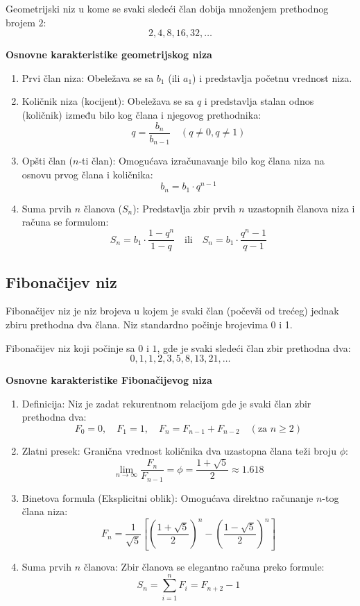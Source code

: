 \documentclass[12pt,a4paper]{report}
\begin{document}
Geometrijski niz u kome se svaki sledeći član dobija množenjem prethodnog brojem $2$:
\[2, 4, 8, 16, 32, \dots\]

\textbf{Osnovne karakteristike geometrijskog niza} 

\begin{enumerate}
	\item Prvi član niza: Obeležava se sa $b_1$ (ili $a_1$) i predstavlja početnu vrednost niza.
	\item Količnik niza (kocijent): Obeležava se sa $q$ i predstavlja stalan odnos (količnik) između bilo kog člana i njegovog prethodnika:
	\[q = \frac{b_n}{b_{n-1}} \quad (q \neq 0, q \neq 1)\]
	\item Opšti član ($n$-ti član): Omogućava izračunavanje bilo kog člana niza na osnovu prvog člana i količnika:
	\[b_n = b_1 \cdot q^{n-1}\]
	\item Suma prvih $n$ članova ($S_n$): Predstavlja zbir prvih $n$ uzastopnih članova niza i računa se formulom:
	\[S_n = b_1 \cdot \frac{1 - q^n}{1 - q} \quad \text{ili} \quad S_n = b_1 \cdot \frac{q^n - 1}{q - 1}\]
\end{enumerate}

\subsection{Fibonačijev niz}

Fibonačijev niz je niz brojeva u kojem je svaki član (počevši od trećeg) jednak zbiru prethodna dva člana. Niz standardno počinje brojevima 0 i 1.

Fibonačijev niz koji počinje sa $0$ i $1$, gde je svaki sledeći član zbir prethodna dva:
\[0, 1, 1, 2, 3, 5, 8, 13, 21, \dots\]

\textbf{Osnovne karakteristike Fibonačijevog niza}

\begin{enumerate}
	\item Definicija: Niz je zadat rekurentnom relacijom gde je svaki član zbir prethodna dva:
	\[F_0 = 0, \quad F_1 = 1, \quad F_n = F_{n-1} + F_{n-2} \quad (\text{za } n \ge 2)\]
	\item Zlatni presek: Granična vrednost količnika dva uzastopna člana teži broju $\phi$:
	\[\lim_{n \to \infty} \frac{F_n}{F_{n-1}} = \phi = \frac{1+\sqrt{5}}{2} \approx 1.618\]
	\item Binetova formula (Eksplicitni oblik): Omogućava direktno računanje $n$-tog člana niza:
	\[F_n = \frac{1}{\sqrt{5}} \left[ \left(\frac{1+\sqrt{5}}{2}\right)^n - \left(\frac{1-\sqrt{5}}{2}\right)^n \right]\]
	\item Suma prvih $n$ članova: Zbir članova se elegantno računa preko formule:
	\[S_n = \sum_{i=1}^{n} F_i = F_{n+2} - 1\]
\end{enumerate}
\end{document}
